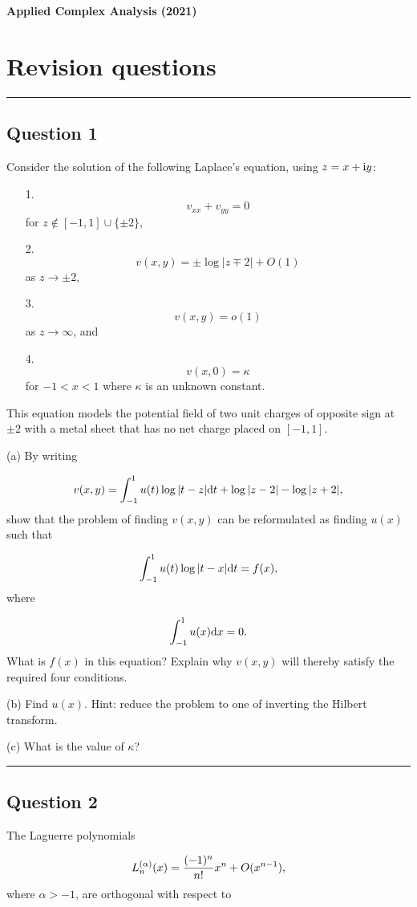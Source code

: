 \documentclass[12pt,a4paper]{article}
\def\D{ {\rm d} }
\def\I{ {\rm i} }
\def\dx{\D x}
\def\dt{\D t}
\begin{document}
\textbf{Applied Complex Analysis (2021)}

\section{Revision questions}
\rule{\textwidth}{1pt}
\subsection{Question 1}
Consider the solution of the following Laplace's equation, using $z = x + \I y$:

\begin{itemize}
\item[1. ] \[
v_{xx} + v_{yy} = 0
\]
for $z \notin [-1,1] \cup \{\pm2\}$,


\item[2. ] \[
v(x,y) = \pm \log |z \mp 2| + O(1)
\]
as $z \rightarrow \pm 2$,


\item[3. ] \[
v(x,y) = o(1)
\]
as  $z \rightarrow \infty$, and


\item[4. ] \[
v(x,0) = \kappa
\]
for $-1 < x < 1$ where $\kappa$ is an unknown constant.

\end{itemize}
This equation models the potential field of two unit charges of opposite sign at $\pm 2$ with a metal sheet that has no net charge placed on $[-1,1]$.

(a) By writing

\[
v(x,y) = \int_{-1}^1 u(t) \log | t - z| \dt + \log|z-2| - \log | z+2|,
\]
show that  the problem of finding $v(x,y)$ can be reformulated as finding $u(x)$ such that

\[
\int_{-1}^1 u(t) \log|t - x| \dt = f(x),
\]
where

\[
 \int_{-1}^1 u(x) \dx = 0.
\]
What is $f(x)$ in this equation? Explain why $v(x,y)$ will thereby satisfy the required four conditions.

(b) Find $u(x)$. Hint: reduce the problem to one of inverting the Hilbert transform.

(c) What is the value of $\kappa$?

\rule{\textwidth}{1pt}
\subsection{Question 2}
The Laguerre polynomials

\[
L_n^{(\alpha)}(x) = {(-1)^n \over n! } x^n + O(x^{n-1}),
\]
where $\alpha > -1$, are orthogonal with respect to
\end{document}

